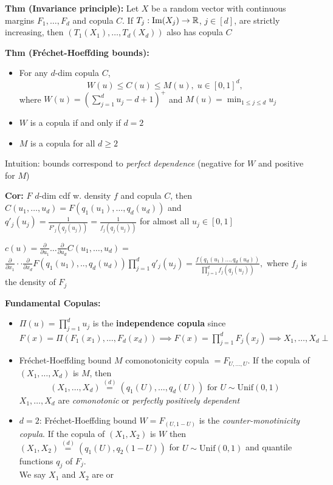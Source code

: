 \textbf{Thm (Invariance principle):} Let $X$ be a random vector with continuous margins $F_1,\dots,F_d$ and copula $C$. If $T_j:\text{Im}(X_j)\rightarrow\mathbb{R}$, $j\in[d]$, are strictly increasing, then
$(T_1(X_1),\dots,T_d(X_d))$ also has copula $C$

\textbf{Thm (Fréchet-Hoeffding bounds):}
\begin{itemize}
    \item For any $d$-dim copula $C$,
    \[ W(u) \leq C(u) \leq M(u),\; u\in[0,1]^d,\]
    where $W(u)=(\sum^d_{j=1}u_j - d + 1)^+$ and $M(u)=\min_{1\leq j\leq d} u_j$
    \item $W$ is a copula if and only if $d=2$
    \item $M$ is a copula for all $d\geq 2$
\end{itemize}

Intuition: bounds correspond to \textit{perfect dependence} (negative for $W$ and positive for $M$)

\textbf{Cor:} $F$ $d$-dim cdf w. density $f$ and copula $C$, then
$C(u_1,\dots,u_d)=F(q_1(u_1),\dots,q_d(u_d))$ and $q'_j(u_j)=\frac{1}{F'_j(q_j(u_j))}=\frac{1}{f_j(q_j(u_j))}$ for almost all $u_j\in[0,1]$

$c(u)=\frac{\partial}{\partial u_1}\dots\frac{\partial}{\partial u_d} C(u_1,\dots,u_d)=$\\
$\frac{\partial}{\partial x_1}\cdot\cdot\frac{\partial}{\partial x_d}F(q_1(u_1),..,q_d(u_d))\prod^d_{j=1}q'_j(u_j)=\frac{f(q_1(u_1)\dots,q_d(u_d))}{\prod^d_{j=1} f_j(q_j(u_j))},$ where $f_j$ is the density of $F_j$

\textbf{Fundamental Copulas:}
\begin{itemize}
    \item $\Pi(u)=\prod^d_{j=1} u_j$ is the \textbf{independence copula} since 
    $F(x)=\Pi(F_1(x_1),\dots,F_d(x_d))\implies F(x)=\prod^d_{j=1} F_j(x_j)\implies X_1,\dots,X_d\perp$ 
    \item Fréchet-Hoeffding bound $M$ comonotonicity copula $=F_{U,\dots,U}$.
    If the copula of $(X_1,\dots,X_d)$ is $M$, then \[(X_1,\dots,X_d)\stackrel{(d)}{=}(q_1(U),\dots,q_d(U))\text{ for  }U\sim\text{Unif}(0,1)\]
    $X_1,\dots,X_d$ are \textit{comonotonic} or \textit{perfectly positively dependent}
    \item $d=2$: Fréchet-Hoeffding bound $W=F_{(U,1-U)}$ is the \textit{counter-monotinicity copula}. If the copula of $(X_1,X_2)$ is $W$ then $(X_1,X_2)\stackrel{(d)}{=}(q_1(U),q_2(1-U))$ for $U\sim\text{Unif}(0,1)$ and quantile functions $q_j$ of $F_j$.\\
    We say $X_1$ and $X_2$ are  or 
\end{itemize}

